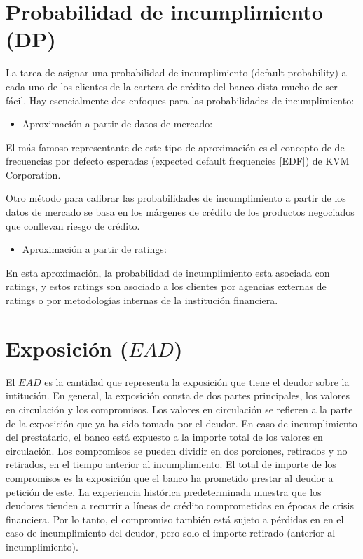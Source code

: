 \documentclass[
  12pt,
]{krantz}
\providecommand{\tightlist}{%
  \setlength{\itemsep}{0pt}\setlength{\parskip}{0pt}}
\theoremstyle{definition}
\theoremstyle{definition}
\theoremstyle{definition}
\theoremstyle{remark}
\begin{document}
\hypertarget{probabilidad-de-incumplimiento-dp}{%
\section{Probabilidad de incumplimiento (DP)}\label{probabilidad-de-incumplimiento-dp}}

La tarea de asignar una probabilidad de incumplimiento (default probability) a cada uno de los clientes de la cartera de crédito del banco dista mucho de ser fácil. Hay esencialmente dos enfoques para las probabilidades de incumplimiento:

\begin{itemize}
\tightlist
\item
  Aproximación a partir de datos de mercado:
\end{itemize}

El más famoso representante de este tipo de aproximación es el concepto de de frecuencias por defecto esperadas (expected default frequencies {[}EDF{]}) de KVM Corporation.

Otro método para calibrar las probabilidades de incumplimiento a partir de los datos de mercado se basa en los márgenes de crédito de los productos negociados que conllevan riesgo de crédito.

\begin{itemize}
\tightlist
\item
  Aproximación a partir de ratings:
\end{itemize}

En esta aproximación, la probabilidad de incumplimiento esta asociada con ratings, y estos ratings son asociado a los clientes por agencias externas de ratings o por metodologías internas de la institución financiera.

\hypertarget{exposicion-ead}{%
\section{\texorpdfstring{Exposición (\(EAD\))}{Exposición (EAD)}}\label{exposicion-ead}}

El \(EAD\) es la cantidad que representa la exposición que tiene el deudor sobre la intitución. En general, la exposición consta de dos partes principales, los valores en circulación y los compromisos. Los valores en circulación se refieren a la parte de la exposición que ya ha sido tomada por el deudor. En caso de incumplimiento del prestatario, el banco está expuesto a la importe total de los valores en circulación.
Los compromisos se pueden dividir en dos porciones, retirados y no retirados, en el tiempo anterior al incumplimiento. El total de importe de los compromisos es la exposición que el banco ha prometido prestar al deudor a petición de este. La experiencia histórica predeterminada muestra que los deudores tienden a recurrir a líneas de crédito comprometidas en épocas de crisis financiera. Por lo tanto, el compromiso también está sujeto a pérdidas en en el caso de incumplimiento del deudor, pero solo el importe retirado (anterior al incumplimiento).
\end{document}
